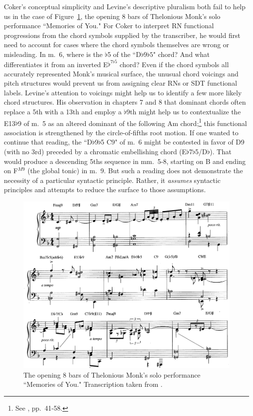 Coker's conceptual simplicity and Levine's descriptive pluralism both fail to help us in the case of Figure~\ref{monk}, the opening 8 bars of Thelonious Monk's solo performance ``Memories of You."  For Coker to interpret RN functional progressions from the chord symbols supplied by the transcriber, he would first need to account for cases where the chord symbols themselves are wrong or misleading.  In m.\ 6, where is the $\flat$5 of the ``D$\flat 9\flat 5$" chord?  And what differentiates it from an inverted E$\flat^{7\flat 5}$ chord?  Even if the chord symbols all accurately represented Monk's musical surface, the unusual chord voicings and pitch structures would prevent us from assigning clear RNs or SDT functional labels.  Levine's attention to voicings might help us to identify a few more likely chord structures.  His observation in chapters 7 and 8 that dominant chords often replace a 5th with a 13th and employ a $\flat$9th might help us to contextualize the E13$\flat$9 of m.\ 5 as an altered dominant of the following Am chord;\footnote{See \cite{levine1989}, pp.\ 41-58.} this functional association is strengthened by the circle-of-fifths root motion.  If one wanted to continue that reading, the ``D$\flat$9$\flat$5 C9" of m.\ 6 might be contested in favor of D9 (with no 3rd) preceded by a chromatic embellishing chord (E$\flat$7$\flat$5/D$\flat$). That would produce a descending 5ths sequence in mm.\ 5-8, starting on B and ending on F$^{M9}$ (the global tonic) in m.\ 9.   But such a reading does not demonstrate the necessity of a particular syntactic principle.  Rather, it \emph{assumes} syntactic principles and attempts to reduce the surface to those assumptions.
\begin{figure}
	\centering
	\caption{The opening 8 bars of Thelonious Monk's solo performance ``Memories of You."  Transcription taken from \cite{monkStandards}.}
	\label{monk}
	\includegraphics[width=6in]{diss_prospectus_monk.png}
\end{figure}


